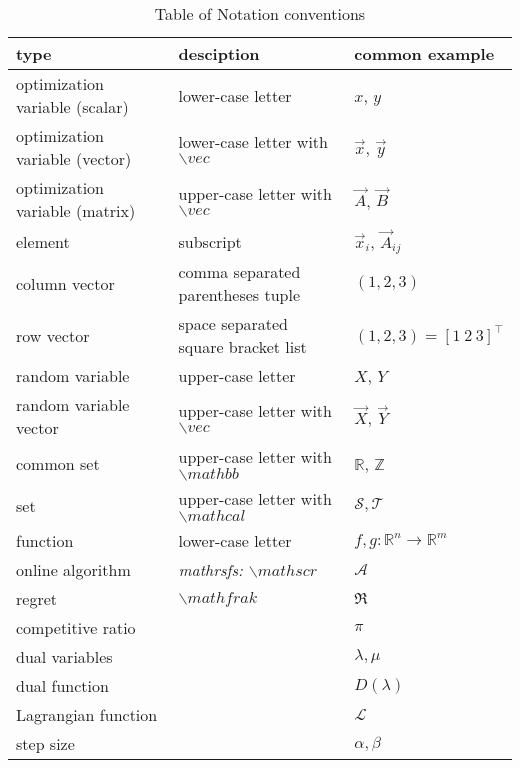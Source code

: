 \documentclass[preview]{standalone}
\begin{document}
    
\begin{table} \footnotesize  
    \caption{Table of Notation conventions}
    \begin{tabularx}{\linewidth}{lll}
    \hline
    type & desciption & common example \\ \hline \hline
    optimization variable (scalar) & lower-case letter & $x$, $y$ \\
    optimization variable (vector) & lower-case letter with $\backslash vec$ & $\vec{x}$, $\vec{y}$ \\
    optimization variable (matrix) & upper-case letter with $\backslash vec$ & $\vec{A}$, $\vec{B}$ \\
    element & subscript & $\vec{x}_i$, $\vec{A}_{ij}$ \\
    column vector & comma separated parentheses tuple &  $(1,2,3)$\\
    row vector & space separated square bracket list &  $(1,2,3) = [1\ 2\ 3]^{\top}$\\
    random variable & upper-case letter & $X$, $Y$ \\
    random variable vector & upper-case letter with $\backslash vec$ & $\vec{X}$, $\vec{Y}$ \\
    common set & upper-case letter with $\backslash mathbb$ & $\mathbb{R}$, $\mathbb{Z}$ \\
    set & upper-case letter with $\backslash mathcal$ & $\mathcal{S}, \mathcal{T} $ \\
    function & lower-case letter & $f,g:\mathbb{R}^n \rightarrow \mathbb{R}^m$ \\
    \hline \hline
    online algorithm & \emph{mathrsfs: $\backslash mathscr$ }  & $\mathscr{A}$ \\
    regret & $\backslash mathfrak$ & $\mathfrak{R}$ \\
    competitive ratio && $\pi$ \\
    dual variables && $\lambda, \mu $ \\
    dual function &&  $D(\lambda)$ \\
    Lagrangian function && $\mathcal{L}$ \\
    step size && $\alpha,\beta$ \\
    \hline \hline
    \end{tabularx}
\end{table}
\end{document}
